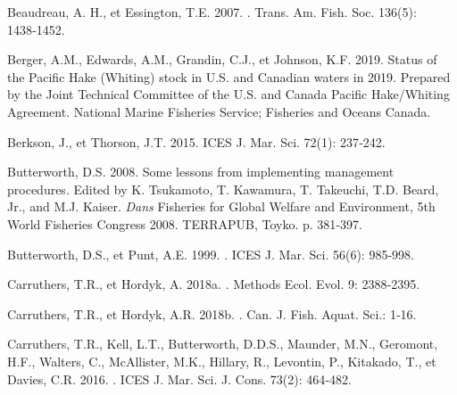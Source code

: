 \documentclass[french,11pt]{book}
\begin{document}
\begin{CSLReferences}{1}{0}
%
Beaudreau, A. H., et Essington, T.E. 2007. . Trans. Am. Fish. Soc. 136(5): 1438‑1452.

%
Berger, A.M., Edwards, A.M., Grandin, C.J., et Johnson, K.F. 2019. Status of the {Pacific Hake (Whiting)} stock in {U.S.} and {Canadian} waters in 2019. {P}repared by the {Joint Technical Committee} of the {U.S}. and {Canada} {Pacific Hake/Whiting Agreement}. National Marine Fisheries Service; {Fisheries and Oceans Canada}.

%
Berkson, J., et Thorson, J.T. 2015.  ICES J. Mar. Sci. 72(1): 237‑242.

%
Butterworth, D.S. 2008. Some lessons from implementing management procedures. {Edited} by {K}. {Tsukamoto}, {T}. {Kawamura}, {T}. {Takeuchi}, {T}.{D}. {Beard}, {Jr}., and {M}.{J}. {Kaiser}. \emph{Dans} Fisheries for {Global} {Welfare} and {Environment}, 5th {World} {Fisheries} {Congress} 2008. TERRAPUB, Toyko. p. 381‑397.

%
Butterworth, D.S., et Punt, A.E. 1999. . ICES J. Mar. Sci. 56(6): 985‑998.

%
Carruthers, T.R., et Hordyk, A. 2018a. . Methods Ecol. Evol. 9: 2388‑2395.

%
Carruthers, T.R., et Hordyk, A.R. 2018b. . Can. J. Fish. Aquat. Sci.: 1‑16.

%
Carruthers, T.R., Kell, L.T., Butterworth, D.D.S., Maunder, M.N., Geromont, H.F., Walters, C., McAllister, M.K., Hillary, R., Levontin, P., Kitakado, T., et Davies, C.R. 2016. . ICES J. Mar. Sci. J. Cons. 73(2): 464‑482.


\end{CSLReferences}
\end{document}

